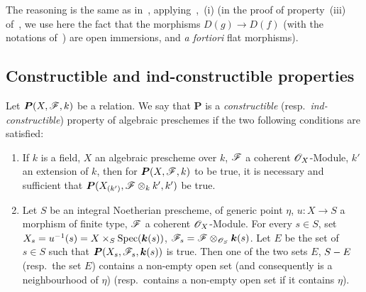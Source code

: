 The reasoning is the same as in~, applying~,~(i) (in the proof of property~(iii) of~, we use here the fact that the morphisms $D(g)\to D(f)$ (with the notations of~) are open immersions, and \emph{a fortiori} flat morphisms).

\subsection{Constructible and ind-constructible properties}
\label{subsection:IV.9.2}
\label{IV.9.2}

\begin{definition}[9.2.1]
\label{IV.9.2.1}
Let $\boldsymbol{P}(X,\mathscr{F},k)$ be a relation.
We say that $\boldsymbol{P}$ is a \emph{constructible} (resp.\ \emph{ind-constructible}) property of algebraic preschemes if the two following conditions are satisfied:
\begin{enumerate}[label=(\roman*)]
  \item If $k$ is a field, $X$ an algebraic prescheme over $k$, $\mathscr{F}$ a coherent $\mathscr{O}_X$-Module, $k'$ an extension of $k$, then for $\boldsymbol{P}(X,\mathscr{F},k)$ to be true, it is necessary and sufficient that $\boldsymbol{P}(X_{(k')},\mathscr{F}\otimes_k k',k')$ be true.
  \item Let $S$ be an integral Noetherian prescheme, of generic point $\eta$, $u:X\to S$ a morphism of finite type, $\mathscr{F}$ a coherent $\mathscr{O}_X$-Module.
For every $s\in S$, set $X_s=u^{-1}(s)=X\times_S\operatorname{Spec}(\boldsymbol{k}(s))$, $\mathscr{F}_s=\mathscr{F}\otimes_{\mathscr{O}_S}\boldsymbol{k}(s)$.
Let $E$ be the set of $s\in S$ such that $\boldsymbol{P}(X_s,\mathscr{F}_s,\boldsymbol{k}(s))$ is true.
Then one of the two sets $E$, $S- E$ (resp.\ the set $E$) contains a non-empty open set (and consequently is a neighbourhood of $\eta$) (resp.\ contains a non-empty open set if it contains $\eta$).
\end{enumerate}
\end{definition}



